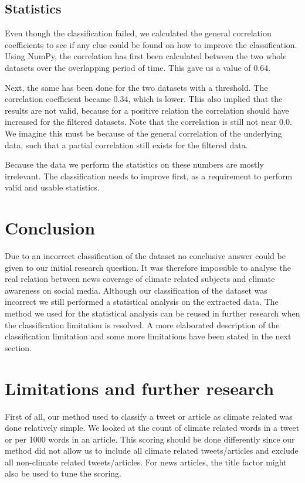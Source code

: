 \documentclass[paper=a4, fontsize=9px]{scrartcl} %
\numberwithin{equation}{section} %
\numberwithin{figure}{section} %
\numberwithin{table}{section} %
\begin{document}
\begin{multicols}{2}
\subsection{Statistics}

Even though the classification failed, we calculated the general correlation coefficients to see if any clue could be found on how to improve the classification. Using NumPy, the correlation has first been calculated between the two whole datasets over the overlapping period of time. This gave us a value of 0.64. 

Next, the same has been done for the two datasets with a threshold. The correlation coefficient  became 0.34, which is lower. This also implied that the results are not valid, because for a positive relation the correlation should have increased for the filtered datasets. Note that the correlation is still not near 0.0. We imagine this must be because of the general correlation of the underlying data, such that a partial correlation still exists for the filtered data.

Because the data we perform the statistics on these numbers are mostly irrelevant. The classification needs to improve first, as a requirement to perform valid and usable statistics. 

\section{Conclusion}\label{sec:conclusion}

Due to an incorrect classification of the dataset no conclusive answer could be given to our initial research question. It was therefore impossible to analyse the real relation between news coverage of climate related subjects and climate awareness on social media. Although our classification of the dataset was incorrect we still performed a statistical analysis on the extracted data. The method we used for the statistical analysis can be reused in further research when the classification limitation is resolved.  A more elaborated description of the classification limitation and some more limitations have been stated in the next section. 


\section{Limitations and further research}\label{sec:limitations}

First of all, our method used to classify a tweet or article as climate related was done relatively simple. We looked at the count of climate related words in a tweet or per 1000 words in an article. This scoring should be done differently since our method did not allow us to include all climate related tweets/articles and exclude all non-climate related tweets/articles. For news articles, the title factor might also be used to tune the scoring.


\end{multicols}
\end{document}
